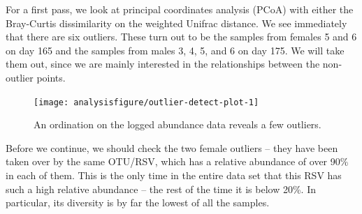 For a first pass, we look at principal coordinates analysis (PCoA) with
either the Bray-Curtis dissimilarity on the weighted Unifrac
distance. We see immediately that there are six outliers. These turn
out to be the samples from females 5 and 6 on day 165 and the samples
from males 3, 4, 5, and 6 on day 175. We will take them out, since we
are mainly interested in the relationships between the non-outlier
points.
\begin{knitrout}
\color{fgcolor}\begin{kframe}
\begin{alltt}
 \hlkwb{<-}  \hlstd{(}\hlstd{)} \hlstd{(} \hlopt{+} 
\hlopt{$} \hlkwb{<-} \hlstd{(}\hlopt{$}
                                      \hlstd{=} \hlstd{(}\hlstd{,} \hlstd{,} \hlstd{,} \hlstd{))}
 \hlkwb{<-}   \hlstd{=} \hlstd{,}  \hlstd{=} \hlstd{)}
\end{alltt}
\end{kframe}
\end{knitrout}

\begin{figure}[H]
\begin{knitrout}
\color{fgcolor}\begin{kframe}
\begin{alltt}
 \hlkwb{<-} \hlopt{$}\hlopt{$}
  \hlstd{=} \hlstd{)} \hlopt{+}
  \hlstd{(} \hlstd{=} \hlstd{)} \hlopt{+}
  \hlstd{(}\hlstd{(evals[}\hlstd{]} \hlopt{/} \hlstd{evals[}\hlstd{]))}
\end{alltt}
\end{kframe}

{\centering \texttt{[image: analysisfigure/outlier-detect-plot-1]} 

}



\end{knitrout}
\label{fig:outlier-detect}
\caption{An ordination on the logged abundance data reveals a few
  outliers.}
\end{figure}
Before we continue, we should check the two female
outliers -- they have been taken over by the same OTU/RSV, which has a
relative abundance of over 90\% in each of them. This is the only time
in the entire data set that this RSV has such a high relative
abundance -- the rest of the time it is below 20\%. In particular, its
diversity is by far the lowest of all the samples.


